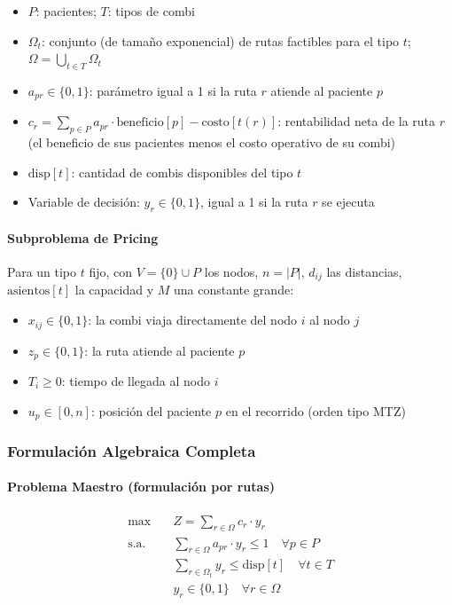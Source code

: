 \documentclass[12pt]{article}
\numberwithin{algorithm}{section}
\begin{document}
\begin{itemize}
    \item $P$: pacientes; $T$: tipos de combi
    \item $\Omega_t$: conjunto (de tamaño exponencial) de rutas factibles para el tipo $t$; $\Omega = \bigcup_{t \in T} \Omega_t$
    \item $a_{pr} \in \{0,1\}$: parámetro igual a 1 si la ruta $r$ atiende al paciente $p$
    \item $c_r = \sum_{p \in P} a_{pr} \cdot \text{beneficio}[p] - \text{costo}[t(r)]$: rentabilidad neta de la ruta $r$ (el beneficio de sus pacientes menos el costo operativo de su combi)
    \item $\text{disp}[t]$: cantidad de combis disponibles del tipo $t$
    \item Variable de decisión: $y_r \in \{0,1\}$, igual a 1 si la ruta $r$ se ejecuta
\end{itemize}

\paragraph{Subproblema de Pricing}

Para un tipo $t$ fijo, con $V = \{0\} \cup P$ los nodos, $n = |P|$, $d_{ij}$ las distancias, $\text{asientos}[t]$ la capacidad y $M$ una constante grande:
\begin{itemize}
    \item $x_{ij} \in \{0,1\}$: la combi viaja directamente del nodo $i$ al nodo $j$
    \item $z_p \in \{0,1\}$: la ruta atiende al paciente $p$
    \item $T_i \geq 0$: tiempo de llegada al nodo $i$
    \item $u_p \in [0, n]$: posición del paciente $p$ en el recorrido (orden tipo MTZ)
\end{itemize}

\subsubsection{Formulación Algebraica Completa}

\paragraph{Problema Maestro (formulación por rutas)}

\begin{align}
  \max & \quad Z = \sum_{r \in \Omega} c_r \cdot y_r \label{eq:bp_obj}\\
  \text{s.a.} & \quad \sum_{r \in \Omega} a_{pr} \cdot y_r \leq 1 \quad \forall p \in P \label{eq:bp_cover}\\
  & \quad \sum_{r \in \Omega_t} y_r \leq \text{disp}[t] \quad \forall t \in T \label{eq:bp_fleet}\\
  & \quad y_r \in \{0, 1\} \quad \forall r \in \Omega \label{eq:bp_bin}
\end{align}
\end{document}
